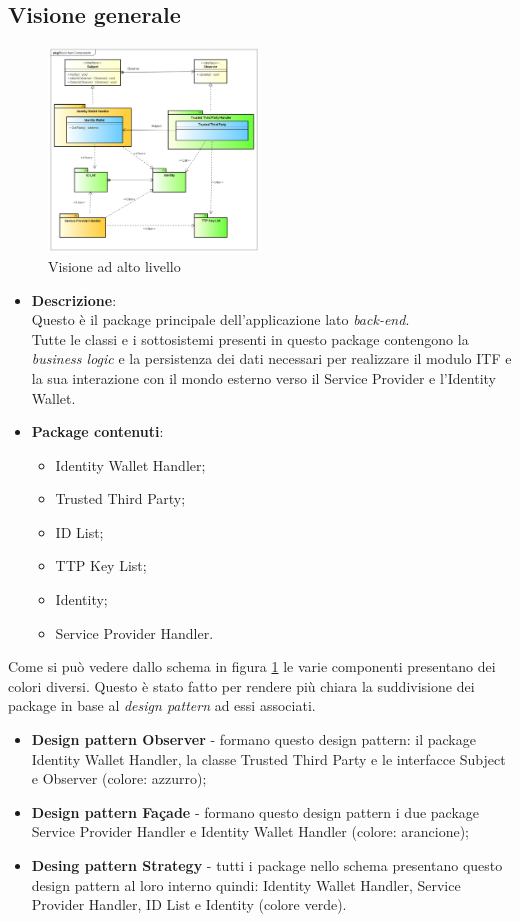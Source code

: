 \subsection{Visione generale}
\begin{figure}[!h]
	\centering
	\includegraphics[width=0.5\textwidth]{immagini/architettura_alto_livello}
	\caption{Visione ad alto livello}
	\label{fig:visioneAltoLivello}
\end{figure}
\begin{itemize}
	\item \textbf{Descrizione}:\\
	Questo è il package principale dell'applicazione lato \textit{back-end}.\\
	Tutte le classi e i sottosistemi presenti in questo package contengono la \textit{business logic} e la persistenza dei dati necessari per realizzare il modulo \gls{ITF} e la sua interazione con il mondo esterno verso il Service Provider e l'Identity Wallet.
	\item \textbf{Package contenuti}:\\
	\begin{itemize}
		\item Identity Wallet Handler;
		\item Trusted Third Party;
		\item ID List;
		\item TTP Key List;
		\item Identity;
		\item Service Provider Handler.
	\end{itemize}	
\end{itemize}
Come si può vedere dallo schema in figura \ref{fig:visioneAltoLivello} le varie componenti presentano dei colori diversi. Questo è stato fatto per rendere più chiara la suddivisione dei package in base al \textit{design pattern} ad essi associati.\\
\begin{itemize}
	\item \textbf{Design pattern Observer} - formano questo design pattern: il package Identity Wallet Handler, la classe Trusted Third Party e le interfacce Subject e Observer (colore: azzurro);
	\item \textbf{Design pattern Façade} - formano questo design pattern i due package Service Provider Handler e Identity Wallet Handler (colore: arancione);
	\item \textbf{Desing pattern Strategy} - tutti i package nello schema presentano questo design pattern al loro interno quindi: Identity Wallet Handler, Service Provider Handler, ID List e Identity (colore verde).
\end{itemize}
